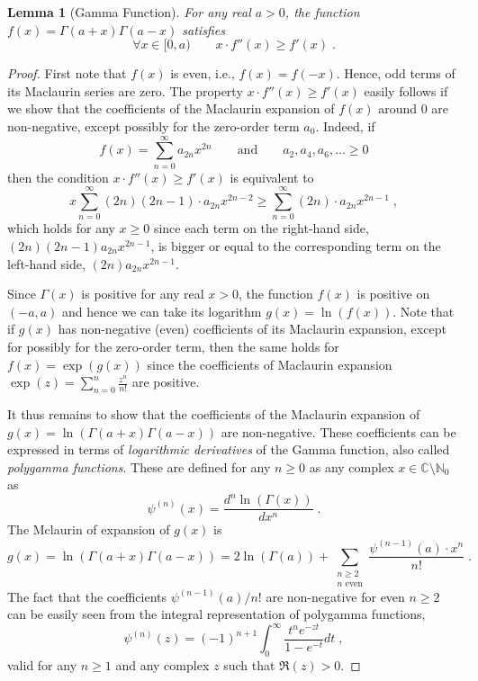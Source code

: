 \documentclass{article}
\newcommand{\N}{\mathbb{N}}  %
\newcommand{\C}{\mathbb{C}}  %
\newtheorem{lemma}[theorem]{Lemma}
\begin{document}
\begin{lemma}[Gamma Function]
\label{lemma:gamma-function}
For any real $a > 0$, the function $f(x) = \Gamma(a+x) \Gamma(a-x)$ satisfies
$$
\forall x \in [0, a) \qquad x \cdot f''(x) \ge f'(x) \; .
$$
\end{lemma}

\begin{proof}
First note that $f(x)$ is even, i.e., $f(x) = f(-x)$. Hence, odd terms of its
Maclaurin series are zero. The property $x \cdot f''(x) \ge f'(x)$ easily
follows if we show that the coefficients of the Maclaurin expansion of $f(x)$
around $0$ are non-negative, except possibly for the zero-order term $a_0$.
Indeed, if
$$
f(x) = \sum_{n=0}^\infty a_{2n} x^{2n} \qquad \text{and} \qquad a_2, a_4, a_6, \dots \ge 0
$$
then the condition $x \cdot f''(x) \ge f'(x)$ is equivalent to
$$
x \sum_{n=0}^\infty (2n)(2n-1) \cdot a_{2n} x^{2n-2} \ge \sum_{n=0}^\infty (2n) \cdot a_{2n} x^{2n-1} \; ,
$$
which holds for any $x \ge 0$ since each term on the right-hand side,
$(2n)(2n-1) a_{2n} x^{2n-1}$, is bigger or equal to the corresponding term on
the left-hand side, $(2n) a_{2n} x^{2n-1}$.

Since $\Gamma(x)$ is positive for any real $x > 0$, the function $f(x)$ is
positive on $(-a,a)$ and hence we can take its logarithm $g(x) = \ln(f(x))$.
Note that if $g(x)$ has non-negative (even) coefficients of its Maclaurin
expansion, except for possibly for the zero-order term, then the same holds for
$f(x) = \exp(g(x))$ since the coefficients of Maclaurin expansion $\exp(z) =
\sum_{n=0}^n \frac{z^n}{n!}$ are positive.

It thus remains to show that the coefficients of the Maclaurin expansion of
$g(x) = \ln(\Gamma(a+x) \Gamma(a-x))$ are non-negative. These coefficients can
be expressed in terms of \emph{logarithmic derivatives} of the Gamma function,
also called \emph{polygamma functions}. These are defined for any $n \ge 0$ as
any complex $x \in \C \setminus \N_{0}$ as
$$
\psi^{(n)}(x) = \frac{d^n\ln(\Gamma(x))}{dx^n} \; .
$$
The Mclaurin of expansion of $g(x)$ is
$$
g(x)
= \ln \left( \Gamma(a+x) \Gamma(a-x) \right)
= 2 \ln(\Gamma(a)) + \sum_{\substack{n \ge 2 \\ \text{$n$ even}}} \frac{\psi^{(n-1)}(a) \cdot x^n}{n!} \; .
$$
The fact that the coefficients $\psi^{(n-1)}(a)/n!$ are non-negative for even $n
\ge 2$ can be easily seen from the integral representation of polygamma
functions,
$$
\psi^{(n)}(z) = (-1)^{n+1} \int_0^\infty \frac{t^n e^{-zt}}{1-e^{-t}} dt \; ,
$$
valid for any $n \ge 1$ and any complex $z$ such that $\Re(z) > 0$.
\end{proof}
\end{document}
